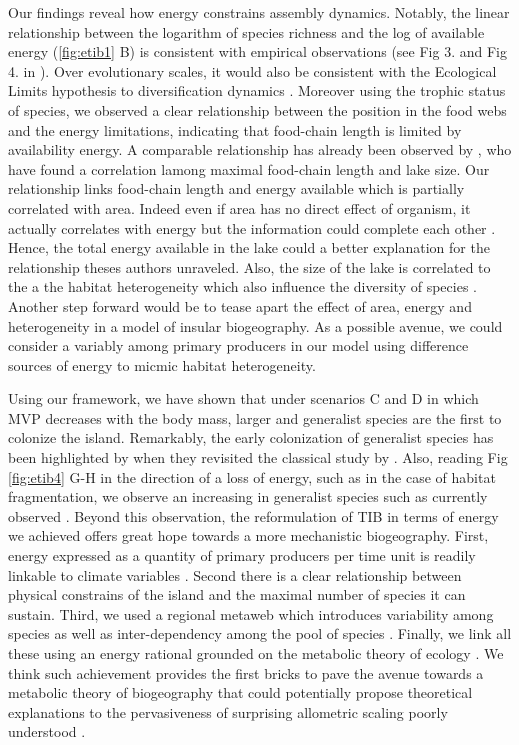Our findings reveal how energy constrains assembly dynamics. Notably,
the linear relationship between the logarithm of species richness and
the log of available energy (\ref{fig:etib1} B) is consistent with
empirical observations (see Fig 3. and Fig 4. in \citet{Wright1983}).
Over evolutionary scales, it would also be consistent with the
Ecological Limits hypothesis to diversification dynamics
\citep{Rabosky2015}. Moreover using the trophic status of species, we
observed a clear relationship between the position in the food webs and
the energy limitations, indicating that food-chain length is limited by
availability energy. A comparable relationship has already been observed
by \citet{Post2000}, who have found a correlation lamong maximal
food-chain length and lake size. Our relationship links food-chain
length and energy available which is partially correlated with area.
Indeed even if area has no direct effect of organism, it actually
correlates with energy but the information could complete each other
\citep{Storch2005}. Hence, the total energy available in the lake could
a better explanation for the relationship theses authors unraveled.
Also, the size of the lake is correlated to the a the habitat
heterogeneity which also influence the diversity of species
\citep{Allouche2012}. Another step forward would be to tease apart the
effect of area, energy and heterogeneity in a model of insular
biogeography. As a possible avenue, we could consider a variably among
primary producers in our model using difference sources of energy to
micmic habitat heterogeneity.

Using our framework, we have shown that under scenarios C and D in which
MVP decreases with the body mass, larger and generalist species are the
first to colonize the island. Remarkably, the early colonization of
generalist species has been highlighted by \citet{Piechnik2008} when
they revisited the classical study by \citet{Simberloff1969}. Also,
reading Fig \ref{fig:etib4} G-H in the direction of a loss of energy,
such as in the case of habitat fragmentation, we observe an increasing
in generalist species such as currently observed \citet{Clavel2011}.
Beyond this observation, the reformulation of TIB in terms of energy we
achieved offers great hope towards a more mechanistic biogeography.
First, energy expressed as a quantity of primary producers per time unit
is readily linkable to climate variables
\citep{Wright1983, Hawkins2003, Evans2005}. Second there is a clear
relationship between physical constrains of the island and the maximal
number of species it can sustain. Third, we used a regional metaweb
which introduces variability among species as well as inter-dependency
among the pool of species \citep{Gravel2011}. Finally, we link all these
using an energy rational grounded on the metabolic theory of ecology
\citep{Brown2004}. We think such achievement provides the first bricks
to pave the avenue towards a metabolic theory of biogeography that could
potentially propose theoretical explanations to the pervasiveness of
surprising allometric scaling poorly understood \citep{Hatton2015}.

